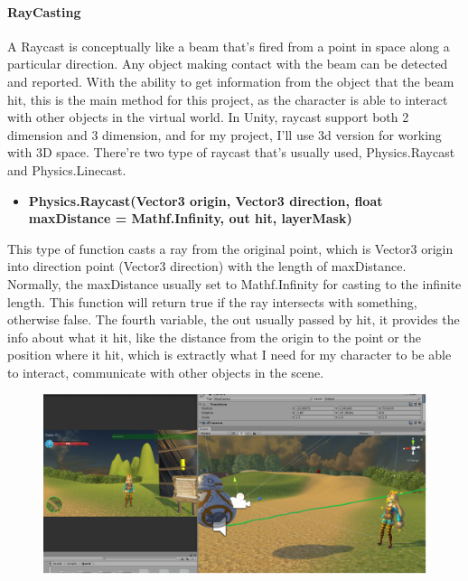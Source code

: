 \documentclass[a4paper, 13pt]{extarticle}
\begin{document}
\paragraph{RayCasting}
  A Raycast is conceptually like a beam that's fired from a point in space along a particular direction. Any object making contact with the beam can be detected and reported. With the ability to get information from the object that the beam hit, this is the main method for this project, as the character is able to interact with other objects in the virtual world. In Unity, raycast support both 2 dimension and 3 dimension, and for my project, I'll use 3d version for working with 3D space. There're two type of raycast that's usually used, Physics.Raycast and Physics.Linecast.
  \begin{itemize}
  	\item \bfseries Physics.Raycast(Vector3 origin,  Vector3 direction, float maxDistance = Mathf.Infinity, out hit, layerMask)	 	
  \end{itemize}
 	This type of function casts a ray from the original point, which is Vector3 origin into direction point (Vector3 direction) with the length of maxDistance. Normally, the maxDistance usually set to Mathf.Infinity for casting to the infinite length. This function will return true if the ray intersects with something, otherwise false. The fourth variable, the out usually passed by hit, it provides the info about what it hit, like the distance from the origin to the point or the position where it hit, which is extractly what I need for my character to be able to interact, communicate with other objects in the scene.
 	\begin{figure}[h]
 		
 		\begin{minipage}{1\textwidth}
 			\centering
 			\includegraphics[width=1\linewidth]{intructions/RayCast_example1.png}
 			\centering
 			\label{fig:test14}
 		\end{minipage}
 	
 	\end{figure} 
 	
\end{document}
